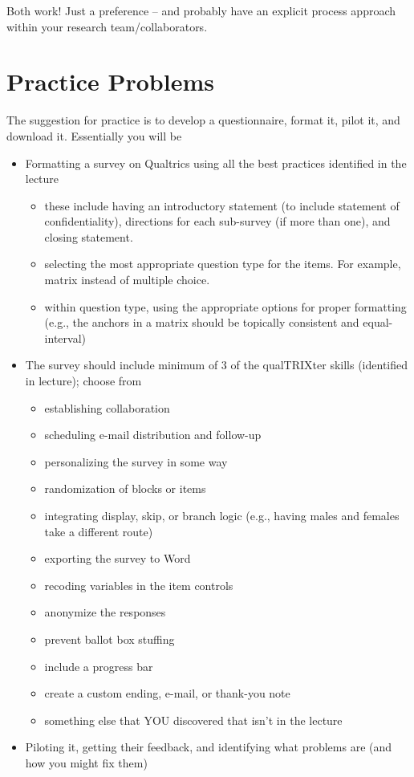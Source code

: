\documentclass[
  english,
]{book}
\providecommand{\tightlist}{%
  \setlength{\itemsep}{0pt}\setlength{\parskip}{0pt}}
\begin{document}
Both work! Just a preference -- and probably have an explicit process approach within your research team/collaborators.

\hypertarget{practice-problems-1}{%
\section{Practice Problems}\label{practice-problems-1}}

The suggestion for practice is to develop a questionnaire, format it, pilot it, and download it. Essentially you will be

\begin{itemize}
\tightlist
\item
  Formatting a survey on Qualtrics using all the best practices identified in the lecture

  \begin{itemize}
  \tightlist
  \item
    these include having an introductory statement (to include statement of confidentiality), directions for each sub-survey (if more than one), and closing statement.
  \item
    selecting the most appropriate question type for the items. For example, matrix instead of multiple choice.
  \item
    within question type, using the appropriate options for proper formatting (e.g., the anchors in a matrix should be topically consistent and equal-interval)
  \end{itemize}
\item
  The survey should include minimum of 3 of the qualTRIXter skills (identified in lecture); choose from

  \begin{itemize}
  \tightlist
  \item
    establishing collaboration
  \item
    scheduling e-mail distribution and follow-up
  \item
    personalizing the survey in some way
  \item
    randomization of blocks or items
  \item
    integrating display, skip, or branch logic (e.g., having males and females take a different route)
  \item
    exporting the survey to Word
  \item
    recoding variables in the item controls
  \item
    anonymize the responses
  \item
    prevent ballot box stuffing
  \item
    include a progress bar
  \item
    create a custom ending, e-mail, or thank-you note
  \item
    something else that YOU discovered that isn't in the lecture
  \end{itemize}
\item
  Piloting it, getting their feedback, and identifying what problems are (and how you might fix them)


\end{itemize}
\end{document}
